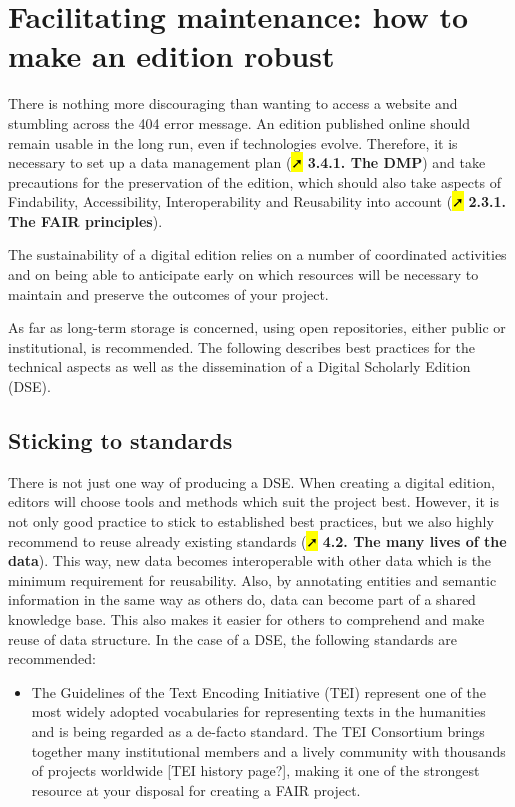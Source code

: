 \documentclass[
  letterpaper,
  DIV=11,
  numbers=noendperiod]{scrreprt}
\providecommand{\tightlist}{%
  \setlength{\itemsep}{0pt}\setlength{\parskip}{0pt}}\usepackage{longtable,booktabs,array}
\begin{document}
\section{Facilitating maintenance: how to make an edition
robust}\label{facilitating-maintenance-how-to-make-an-edition-robust}

There is nothing more discouraging than wanting to access a website and
stumbling across the 404 error message. An edition published online
should remain usable in the long run, even if technologies evolve.
Therefore, it is necessary to set up a data management plan (\hl{➚}
\textbf{3.4.1. The DMP}) and take precautions for the preservation of
the edition, which should also take aspects of Findability,
Accessibility, Interoperability and Reusability into account (\hl{➚}
\textbf{2.3.1. The FAIR principles}).

The sustainability of a digital edition relies on a number of
coordinated activities and on being able to anticipate early on which
resources will be necessary to maintain and preserve the outcomes of
your project.

As far as long-term storage is concerned, using open repositories,
either public or institutional, is recommended. The following describes
best practices for the technical aspects as well as the dissemination of
a Digital Scholarly Edition (DSE).

\subsection{Sticking to standards}\label{sticking-to-standards}

There is not just one way of producing a DSE. When creating a digital
edition, editors will choose tools and methods which suit the project
best. However, it is not only good practice to stick to established best
practices, but we also highly recommend to reuse already existing
standards (\hl{➚} \textbf{4.2. The many lives of the data}). This way,
new data becomes interoperable with other data which is the minimum
requirement for reusability. Also, by annotating entities and semantic
information in the same way as others do, data can become part of a
shared knowledge base. This also makes it easier for others to
comprehend and make reuse of data structure. In the case of a DSE, the
following standards are recommended:

\begin{itemize}
\tightlist
\item
  The Guidelines of the Text Encoding Initiative (TEI) represent one of
  the most widely adopted vocabularies for representing texts in the
  humanities and is being regarded as a de-facto standard. The TEI
  Consortium brings together many institutional members and a lively
  community with thousands of projects worldwide {[}TEI history
  page?{]}, making it one of the strongest resource at your disposal for
  creating a FAIR project.
\end{itemize}
\end{document}

